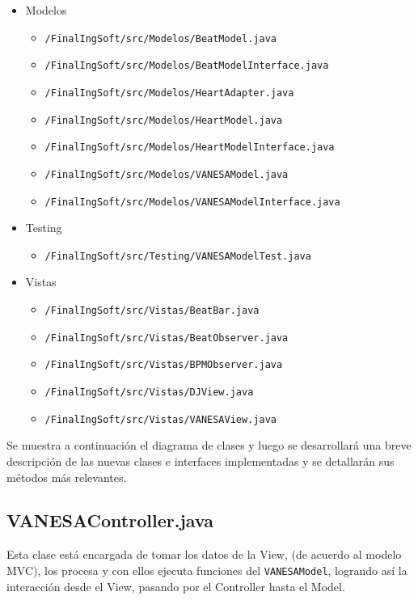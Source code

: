 \documentclass[10pt]{article} %
\begin{document}
\begin{itemize}
\item Modelos
  \begin{itemize}
    \item \verb+/FinalIngSoft/src/Modelos/BeatModel.java+
    \item \verb+/FinalIngSoft/src/Modelos/BeatModelInterface.java+
    \item \verb+/FinalIngSoft/src/Modelos/HeartAdapter.java+
    \item \verb+/FinalIngSoft/src/Modelos/HeartModel.java+
    \item \verb+/FinalIngSoft/src/Modelos/HeartModelInterface.java+
    \item \verb+/FinalIngSoft/src/Modelos/VANESAModel.java+
    \item \verb+/FinalIngSoft/src/Modelos/VANESAModelInterface.java+
  \end{itemize}
\item Testing
  \begin{itemize}
    \item \verb+/FinalIngSoft/src/Testing/VANESAModelTest.java+
  \end{itemize}
\item Vistas
  \begin{itemize}
    \item \verb+/FinalIngSoft/src/Vistas/BeatBar.java+
    \item \verb+/FinalIngSoft/src/Vistas/BeatObserver.java+
    \item \verb+/FinalIngSoft/src/Vistas/BPMObserver.java+
    \item \verb+/FinalIngSoft/src/Vistas/DJView.java+
    \item \verb+/FinalIngSoft/src/Vistas/VANESAView.java+
  \end{itemize}

\end{itemize}

Se muestra a continuación el diagrama de clases y luego se desarrollará una breve descripción de las nuevas clases e interfaces implementadas y se detallarán sus métodos más relevantes.

\subsection{VANESAController.java}
Esta clase está encargada de tomar los datos de la View, (de acuerdo al modelo MVC), los procesa y con ellos ejecuta funciones del \verb+VANESAModel+, logrando así la interacción desde el View, pasando por el Controller hasta el Model.
\end{document}
